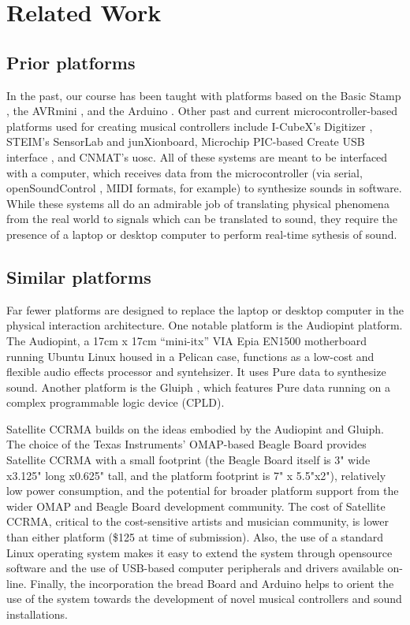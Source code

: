 \section{Related Work}
\subsection{Prior platforms}
In the past, our course has been taught with platforms based on the Basic Stamp \cite{Verplank:2001}, the AVRmini \cite{Wilson:2003}, and the Arduino \cite{Mellis:2007}. Other past and current microcontroller-based platforms used for creating musical controllers include I-CubeX's Digitizer \cite{Mulder:1995}, STEIM's SensorLab and junXionboard, Microchip PIC-based Create USB interface \cite{Overholt:2006}, and CNMAT's uosc. All of these systems are meant to be interfaced with a computer, which receives data from the microcontroller (via serial, openSoundControl \cite{Wright:1997}, MIDI formats, for example) to synthesize sounds in software. While these systems all do an admirable job of translating physical phenomena from the real world to signals which can be translated to sound, they require the presence of a laptop or desktop computer to perform real-time sythesis of sound.

\subsection{Similar platforms}
Far fewer platforms are designed to replace the laptop or desktop computer in the physical interaction architecture. One notable platform is the Audiopint \cite{Merrill:2007} platform. The Audiopint, a 17cm x 17cm ``mini-itx'' VIA Epia EN1500 motherboard running Ubuntu Linux housed in a Pelican case, functions as a low-cost and flexible audio effects processor and syntehsizer. It uses Pure data \cite{Steiner:2005} to synthesize sound. Another platform is the Gluiph \cite{Kartadinata:2003}, which features Pure data running on a complex programmable logic device (CPLD). 

Satellite CCRMA builds on the ideas embodied by the Audiopint and Gluiph. The choice of the Texas Instruments' OMAP-based Beagle Board provides Satellite CCRMA with a small footprint (the Beagle Board itself is 3" wide x3.125" long x0.625" tall, and the platform footprint is 7" x 5.5"x2"), relatively low power consumption, and the potential for broader platform support from the wider OMAP and Beagle Board development community. The cost of Satellite CCRMA, critical to the cost-sensitive artists and musician community, is lower than either platform (\$125 at time of submission). Also, the use of a standard Linux operating system makes it easy to extend the system through opensource software and the use of USB-based computer peripherals and drivers available on-line. Finally, the incorporation the bread Board and Arduino helps to orient the use of the system towards the development of novel musical controllers and sound installations.

